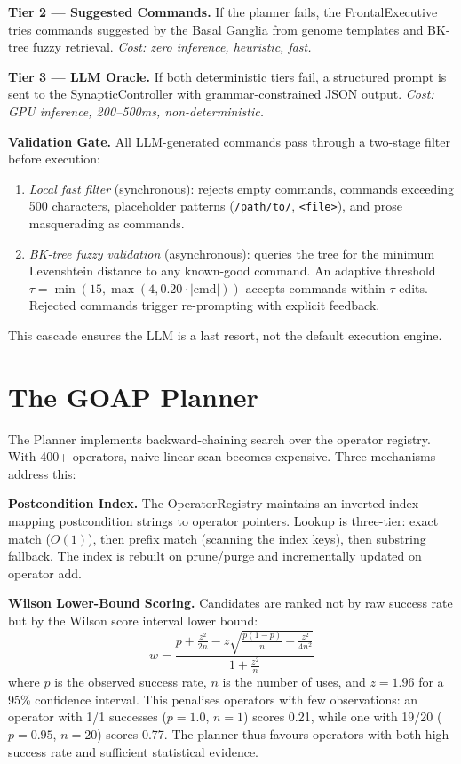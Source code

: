 \documentclass[12pt,a4paper]{report}
\begin{document}
\textbf{Tier 2 --- Suggested Commands.} If the planner fails, the FrontalExecutive tries commands suggested by the Basal Ganglia from genome templates and BK-tree fuzzy retrieval. \emph{Cost: zero inference, heuristic, fast.}

\textbf{Tier 3 --- LLM Oracle.} If both deterministic tiers fail, a structured prompt is sent to the SynapticController with grammar-constrained JSON output. \emph{Cost: GPU inference, 200--500ms, non-deterministic.}

\textbf{Validation Gate.} All LLM-generated commands pass through a two-stage filter before execution:
\begin{enumerate}
    \item \emph{Local fast filter} (synchronous): rejects empty commands, commands exceeding 500 characters, placeholder patterns (\texttt{/path/to/}, \texttt{<file>}), and prose masquerading as commands.
    \item \emph{BK-tree fuzzy validation} (asynchronous): queries the tree for the minimum Levenshtein distance to any known-good command. An adaptive threshold $\tau = \min(15, \max(4, 0.20 \cdot |\text{cmd}|))$ accepts commands within $\tau$ edits. Rejected commands trigger re-prompting with explicit feedback.
\end{enumerate}

This cascade ensures the LLM is a last resort, not the default execution engine.

\section{The GOAP Planner}
The Planner implements backward-chaining search over the operator registry. With 400+ operators, naive linear scan becomes expensive. Three mechanisms address this:

\textbf{Postcondition Index.} The OperatorRegistry maintains an inverted index mapping postcondition strings to operator pointers. Lookup is three-tier: exact match ($O(1)$), then prefix match (scanning the index keys), then substring fallback. The index is rebuilt on prune/purge and incrementally updated on operator add.

\textbf{Wilson Lower-Bound Scoring.} Candidates are ranked not by raw success rate but by the Wilson score interval lower bound:
\begin{equation}
w = \frac{p + \frac{z^2}{2n} - z\sqrt{\frac{p(1-p)}{n} + \frac{z^2}{4n^2}}}{1 + \frac{z^2}{n}}
\label{eq:wilson}
\end{equation}
where $p$ is the observed success rate, $n$ is the number of uses, and $z = 1.96$ for a 95\% confidence interval. This penalises operators with few observations: an operator with 1/1 successes ($p=1.0$, $n=1$) scores 0.21, while one with 19/20 ($p=0.95$, $n=20$) scores 0.77. The planner thus favours operators with both high success rate and sufficient statistical evidence.
\end{document}
